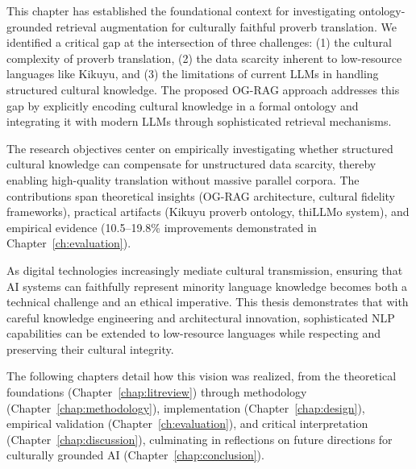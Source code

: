This chapter has established the foundational context for investigating ontology-grounded retrieval augmentation for culturally faithful proverb translation. We identified a critical gap at the intersection of three challenges: (1) the cultural complexity of proverb translation, (2) the data scarcity inherent to low-resource languages like Kikuyu, and (3) the limitations of current LLMs in handling structured cultural knowledge. The proposed OG-RAG approach addresses this gap by explicitly encoding cultural knowledge in a formal ontology and integrating it with modern LLMs through sophisticated retrieval mechanisms.

The research objectives center on empirically investigating whether structured cultural knowledge can compensate for unstructured data scarcity, thereby enabling high-quality translation without massive parallel corpora. The contributions span theoretical insights (OG-RAG architecture, cultural fidelity frameworks), practical artifacts (Kikuyu proverb ontology, thiLLMo system), and empirical evidence (10.5--19.8\% improvements demonstrated in Chapter~\ref{ch:evaluation}).

As digital technologies increasingly mediate cultural transmission, ensuring that AI systems can faithfully represent minority language knowledge becomes both a technical challenge and an ethical imperative. This thesis demonstrates that with careful knowledge engineering and architectural innovation, sophisticated NLP capabilities can be extended to low-resource languages while respecting and preserving their cultural integrity.

The following chapters detail how this vision was realized, from the theoretical foundations (Chapter~\ref{chap:litreview}) through methodology (Chapter~\ref{chap:methodology}), implementation (Chapter~\ref{chap:design}), empirical validation (Chapter~\ref{ch:evaluation}), and critical interpretation (Chapter~\ref{chap:discussion}), culminating in reflections on future directions for culturally grounded AI (Chapter~\ref{chap:conclusion}).
